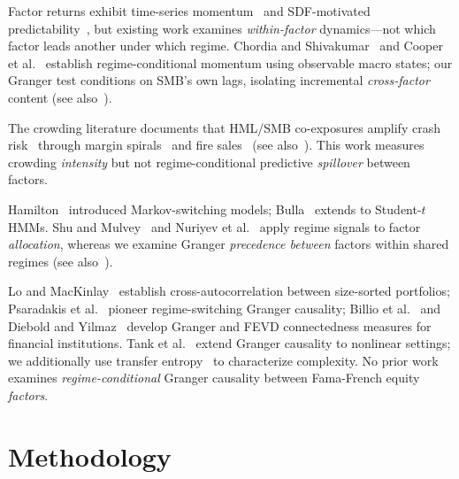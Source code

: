 \documentclass[sigconf,anonymous]{acmart}
\begin{document}
Factor returns exhibit time-series momentum~\cite{ehsani2022factor,gupta2019factor}
and SDF-motivated predictability~\cite{haddad2020factor}, but existing work examines
\emph{within-factor} dynamics---not which factor leads another under which regime.
Chordia and Shivakumar~\cite{chordia2002momentum} and Cooper et al.~\cite{cooper2004market}
establish regime-conditional momentum using observable macro states; our Granger test
conditions on SMB's own lags, isolating incremental \emph{cross-factor} content
(see also~\cite{fama1993common,fama2015five,jegadeesh1993returns,carhart1997persistence,barroso2015momentum,daniel2016momentum,flogel2022momentum,neuhierl2024timing,asness2013value}).

The crowding literature documents that HML/SMB co-exposures amplify crash
risk~\cite{marks2019factor,chincarini2026crowded,betermier2025investor} through
margin spirals~\cite{brunnermeier2009market} and fire
sales~\cite{shleifer1997limits,coval2007asset}
(see also~\cite{stein2009presidential,anton2014connected,lou2022comomentum,kang2021crowding,greenwood2011stock}).
This work measures crowding \emph{intensity} but not regime-conditional
predictive \emph{spillover} between factors.

Hamilton~\cite{hamilton1989new} introduced Markov-switching models;
Bulla~\cite{bulla2011hidden} extends to Student-$t$ HMMs.
Shu and Mulvey~\cite{shu2025dynamic} and Nuriyev et al.~\cite{nuriyev2024regime}
apply regime signals to factor \emph{allocation}, whereas we examine Granger
\emph{precedence between} factors within shared regimes
(see also~\cite{krolzig1997markov,chincoli2017linear,ang2002regime,guidolin2007asset,oelschlager2024fhmm}).

Lo and MacKinlay~\cite{lo1990contrarian} establish cross-autocorrelation between
size-sorted portfolios; Psaradakis et al.~\cite{psaradakis2005markov} pioneer
regime-switching Granger causality; Billio et al.~\cite{billio2012econometric}
and Diebold and Yilmaz~\cite{diebold2012better} develop Granger and FEVD
connectedness measures for financial institutions.
Tank et al.~\cite{tank2022neural} extend Granger causality to nonlinear settings;
we additionally use transfer entropy~\cite{schreiber2000measuring,barnett2009granger}
to characterize complexity.
No prior work examines \emph{regime-conditional} Granger causality
between Fama-French equity \emph{factors}.

\section{Methodology}
\end{document}
